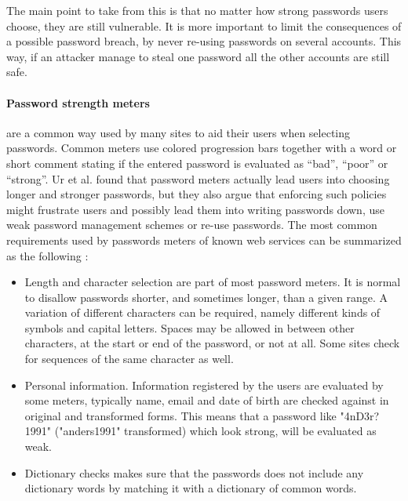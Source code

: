 \par The main point to take from this is that no matter how strong passwords users choose, they are still vulnerable. It is more important to limit the consequences of a possible password breach, by never re-using passwords on several accounts. This way, if an attacker manage to steal one password all the other accounts are still safe. 

\paragraph{Password strength meters} are a common way used by many sites to aid their users when selecting passwords. Common meters use colored progression bars together with a word or short comment stating if the entered password is evaluated as ``bad'', ``poor'' or ``strong''. Ur et al. \cite{password-meters2} found that password meters actually lead users into choosing longer and stronger passwords, but they also argue that enforcing such policies might frustrate users and possibly lead them into writing passwords down, use weak password management schemes or re-use passwords. The most common requirements used by passwords meters of known web services can be summarized as the following \cite{password-meters}:
\begin{itemize}
    \item{Length and character selection} are part of most password meters. It is normal to disallow passwords shorter, and sometimes longer, than a given range. A variation of different characters can be required, namely different kinds of symbols and capital letters. Spaces may be allowed in between other characters, at the start or end of the password, or not at all. Some sites check for sequences of the same character as well.
    \item{Personal information.} Information registered by the users are evaluated by some meters, typically name, email and date of birth are checked against in original and transformed forms. This means that a password like "4nD3r?1991" ("anders1991" transformed) which look strong, will be evaluated as weak.
    \item{Dictionary checks} makes sure that the passwords does not include any dictionary words by matching it with a dictionary of common words. 
\end{itemize}


%

